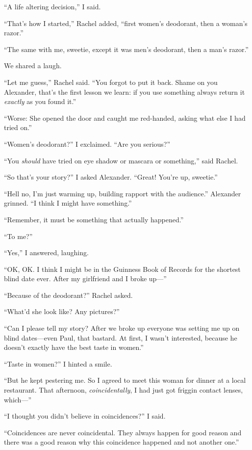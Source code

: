 ``A life altering decision,'' I said.

``That's how I started,'' Rachel added, ``first women's deodorant, then
a woman's razor.''

``The same with me, sweetie, except it was men's deodorant, then a man's
razor.''

We shared a laugh.

``Let me guess,'' Rachel said. ``You forgot to put it back. Shame on you
Alexander, that's the first lesson we learn: if you use something always
return it \emph{exactly} as you found it.''

``Worse: She opened the door and caught me red-handed, asking what else
I had tried on.''

``Women's deodorant?'' I exclaimed. ``Are you serious?''

``You \emph{should} have tried on eye shadow or mascara or something,''
said Rachel.

``So that's your story?'' I asked Alexander. ``Great! You're up,
sweetie.''

``Hell no, I'm just warming up, building rapport with the audience.''
Alexander grinned. ``I think I might have something.''

``Remember, it must be something that actually happened.''

``To me?''

``Yes,'' I answered, laughing.

``OK, OK. I think I might be in the Guinness Book of Records for the
shortest blind date ever. After my girlfriend and I broke up---''

``Because of the deodorant?'' Rachel asked.

``What'd she look like? Any pictures?''

``Can I please tell my story? After we broke up everyone was setting me
up on blind dates---even Paul, that bastard. At first, I wasn't
interested, because he doesn't exactly have the best taste in women.''

``Taste in women?'' I hinted a smile.

``But he kept pestering me. So I agreed to meet this woman for dinner at
a local restaurant. That afternoon, \emph{coincidentally}, I had just
got friggin contact lenses, which---''

``I thought you didn't believe in coincidences?'' I said.

``Coincidences are never coincidental. They always happen for good
reason and there was a good reason why this coincidence happened and not
another one.''

